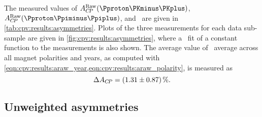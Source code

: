 The measured values of $\ARaw(\pKK)$, $\ARaw(\ppipi)$, and \dACP\ are given in 
\cref{tab:cpv:results:asymmetries}.
Plots of the three measurements for each data sub-sample are given in 
\cref{fig:cpv:results:asymmetries}, where a \chisq\ fit of a constant function 
to the measurements is also shown.
The average value of \dACP\ average across all magnet polarities and years, as 
computed with \cref{eqn:cpv:results:araw_year,eqn:cpv:results:araw_polarity}, 
is measured as
\begin{equation*}
  \dACP = \deltaACP.
\end{equation*}

\subsection{Unweighted asymmetries}


\begin{table}
  \centering
  \caption{%
    Measured asymmetries for each data sub-sample and combination of 
    sub-samples.
    The computation of the combinations, ``2011 + 2012'' and ``Average'', is 
    defined in \cref{chap:cpv:results:combination}.
  }
  \label{tab:results:asymmetries}
    
\end{table}


